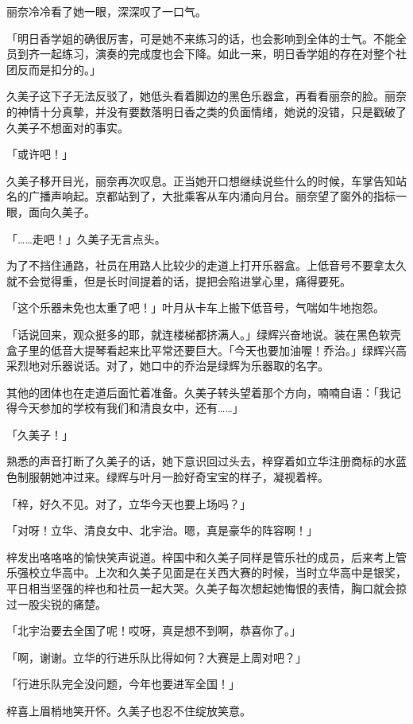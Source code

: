 \documentclass[UTF8]{ctexart}
\begin{document}
    丽奈冷冷看了她一眼，深深叹了一口气。 

    「明日香学姐的确很厉害，可是她不来练习的话，也会影响到全体的士气。不能全员到齐一起练习，演奏的完成度也会下降。如此一来，明日香学姐的存在对整个社团反而是扣分的。」 

    久美子这下子无法反驳了，她低头看着脚边的黑色乐器盒，再看看丽奈的脸。丽奈的神情十分真摰，并没有要数落明日香之类的负面情绪，她说的没错，只是戳破了久美子不想面对的事实。 

    「或许吧！」 

    久美子移开目光，丽奈再次叹息。正当她开口想继续说些什么的时候，车掌告知站名的广播声响起。京都站到了，大批乘客从车内涌向月台。丽奈望了窗外的指标一眼，面向久美子。 

    「……走吧！」久美子无言点头。 

    为了不挡住通路，社员在用路人比较少的走道上打开乐器盒。上低音号不要拿太久就不会觉得重，但是长时间提着的话，提把会陷进掌心里，痛得要死。 

    「这个乐器未免也太重了吧！」叶月从卡车上搬下低音号，气喘如牛地抱怨。 

    「话说回来，观众挺多的耶，就连楼梯都挤满人。」绿辉兴奋地说。装在黑色软壳盒子里的低音大提琴看起来比平常还要巨大。「今天也要加油喔！乔治。」绿辉兴高采烈地对乐器说话。对了，她口中的乔治是绿辉为乐器取的名字。 

    其他的团体也在走道后面忙着准备。久美子转头望着那个方向，喃喃自语：「我记得今天参加的学校有我们和清良女中，还有……」 

    「久美子！」 

    熟悉的声音打断了久美子的话，她下意识回过头去，梓穿着如立华注册商标的水蓝色制服朝她冲过来。绿辉与叶月一脸好奇宝宝的样子，凝视着梓。 

    「梓，好久不见。对了，立华今天也要上场吗？」 

    「对呀！立华、清良女中、北宇治。嗯，真是豪华的阵容啊！」 

    梓发出咯咯咯的愉快笑声说道。梓国中和久美子同样是管乐社的成员，后来考上管乐强校立华高中。上次和久美子见面是在关西大赛的时候，当时立华高中是银奖，平日相当坚强的梓也和社员一起大哭。久美子每次想起她悔恨的表情，胸口就会掠过一股尖锐的痛楚。 

    「北宇治要去全国了呢！哎呀，真是想不到啊，恭喜你了。」 

    「啊，谢谢。立华的行进乐队比得如何？大赛是上周对吧？」 

    「行进乐队完全没问题，今年也要进军全国！」 

    梓喜上眉梢地笑开怀。久美子也忍不住绽放笑意。 
\end{document}
